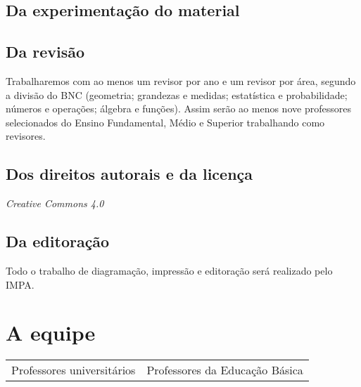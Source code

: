 \documentclass[10 pt]{article}
\begin{document}
\subsection{Da experimentação do material}

\subsection{Da revisão}

Trabalharemos com ao menos um revisor por ano e um revisor por área, segundo a divisão do BNC (geometria; grandezas e medidas; estatística e probabilidade; números e operações; álgebra e funções).
Assim serão ao menos nove professores selecionados do Ensino Fundamental, Médio e Superior trabalhando como revisores.

\subsection{Dos direitos autorais e da licença}

{\it Creative Commons 4.0} %

\subsection{Da editoração}

Todo o trabalho de diagramação, impressão e editoração será realizado pelo IMPA.

\section{A equipe}\label{equipe}

\begin{table}[ht]
  \begin{center}
    \begin{tabular}{ll}
      Professores universitários & Professores da Educação Básica  \\
    \end{tabular}
  \end{center}
\end{table}

\end{document}
